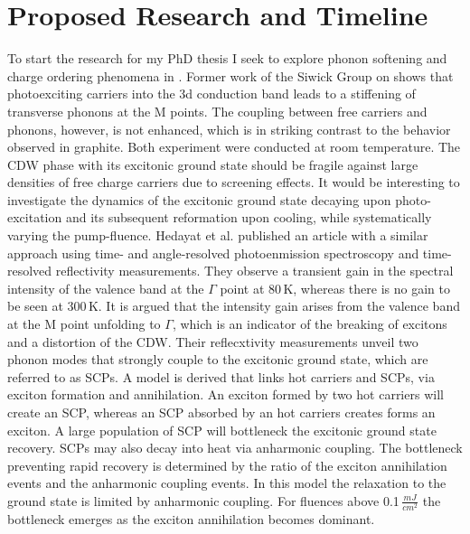 \section{Proposed Research and Timeline}
To start the research for my PhD thesis I seek to explore phonon softening and charge ordering phenomena in \ts.
Former work of the Siwick Group on \ts\space shows that photoexciting carriers into the 3d conduction band leads to a stiffening of transverse phonons at the M points\cite{otto2021}.
The coupling between free carriers and phonons, however, is not enhanced, which is in striking contrast to the behavior observed in graphite\cite{stern2018}.
Both experiment were conducted at room temperature.
The \ac{CDW} phase with its excitonic ground state should be fragile against large densities of free charge carriers due to screening effects.
It would be interesting to investigate the dynamics of the excitonic ground state decaying upon photo-excitation and its subsequent reformation upon cooling, while systematically varying the pump-fluence.
Hedayat et al. published an article with a similar approach using time- and angle-resolved photoenmission spectroscopy and time-resolved reflectivity measurements\cite{hedayat2019}.
They observe a transient gain in the spectral intensity of the valence band at the $\Gamma$ point at 80\,K, whereas there is no gain to be seen at 300\,K.
It is argued that the intensity gain arises from the valence band at the M point unfolding to $\Gamma$, which is an indicator of the breaking of excitons and a distortion of the \ac{CDW}.
Their reflecxtivity measurements unveil two phonon modes that strongly couple to the excitonic ground state, which are referred to as \acp{SCP}.
A model is derived that links hot carriers and \acp{SCP}, via exciton formation and annihilation.
An exciton formed by two hot carriers will create an \ac{SCP}, whereas an \ac{SCP} absorbed by an hot carriers creates forms an exciton.
A large population of \ac{SCP} will bottleneck the excitonic ground state recovery.
\Acp{SCP} may also decay into heat via anharmonic coupling.
The bottleneck preventing rapid recovery is determined by the ratio of the exciton annihilation events and the anharmonic coupling events.
In this model the relaxation to the ground state is limited by anharmonic coupling.
For fluences above 0.1\,$\frac{mJ}{cm^2}$ the bottleneck emerges as the exciton annihilation becomes dominant.

